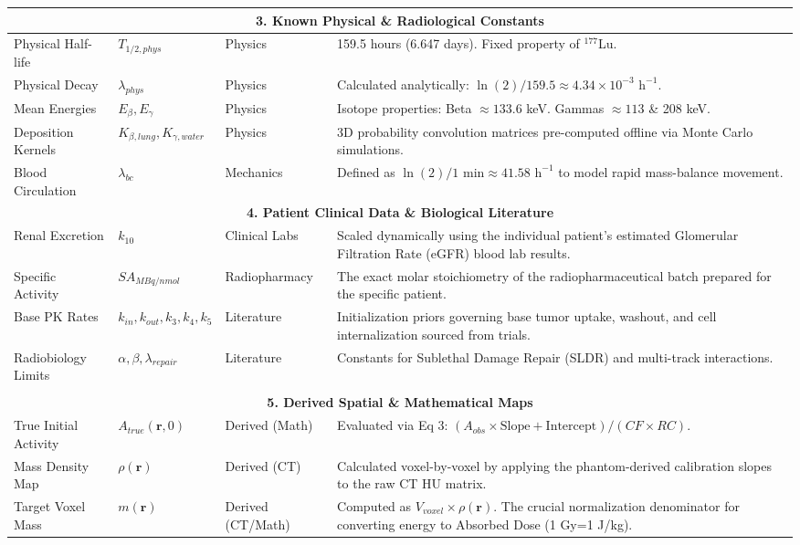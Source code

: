 \documentclass[11pt,a4paper]{article}
\begin{document}
\begin{table}[h!]
\begin{tabularx}{\textwidth}{@{}l l l X@{}}
\multicolumn{4}{c}{\textbf{3. Known Physical \& Radiological Constants}} \\ \midrule
Physical Half-life & $T_{1/2, phys}$ & Physics & 159.5 hours (6.647 days). Fixed property of $^{177}$Lu. \\
Physical Decay & $\lambda_{phys}$ & Physics & Calculated analytically: $\ln(2)/159.5 \approx 4.34 \times 10^{-3} \text{ h}^{-1}$. \\
Mean Energies & $E_\beta, E_\gamma$ & Physics & Isotope properties: Beta $\approx 133.6$ keV. Gammas $\approx 113$ \& 208 keV. \\
Deposition Kernels & $K_{\beta, lung}, K_{\gamma, water}$ & Physics & 3D probability convolution matrices pre-computed offline via Monte Carlo simulations. \\
Blood Circulation & $\lambda_{bc}$ & Mechanics & Defined as $\ln(2)/1 \text{ min} \approx 41.58 \text{ h}^{-1}$ to model rapid mass-balance movement. \\ \midrule
\multicolumn{4}{c}{\textbf{4. Patient Clinical Data \& Biological Literature}} \\ \midrule
Renal Excretion & $k_{10}$ & Clinical Labs & Scaled dynamically using the individual patient's estimated Glomerular Filtration Rate (eGFR) blood lab results. \\
Specific Activity & $SA_{MBq/nmol}$ & Radiopharmacy & The exact molar stoichiometry of the radiopharmaceutical batch prepared for the specific patient. \\
Base PK Rates & $k_{in}, k_{out}, k_3, k_4, k_5$ & Literature & Initialization priors governing base tumor uptake, washout, and cell internalization sourced from trials. \\
Radiobiology Limits & $\alpha, \beta, \lambda_{repair}$ & Literature & Constants for Sublethal Damage Repair (SLDR) and multi-track interactions. \\ \\ \midrule
\multicolumn{4}{c}{\textbf{5. Derived Spatial \& Mathematical Maps}} \\ \midrule
True Initial Activity & $A_{true}(\mathbf{r}, 0)$ & Derived (Math) & Evaluated via Eq 3: $(A_{obs} \times \text{Slope} + \text{Intercept}) / (CF \times RC)$. \\
Mass Density Map & $\rho(\mathbf{r})$ & Derived (CT) & Calculated voxel-by-voxel by applying the phantom-derived calibration slopes to the raw CT HU matrix. \\
Target Voxel Mass & $m(\mathbf{r})$ & Derived (CT/Math) & Computed as $V_{voxel} \times \rho(\mathbf{r})$. The crucial normalization denominator for converting energy to Absorbed Dose (1 Gy=1 J/kg). \\

\end{tabularx}
\end{table}
\end{document}
